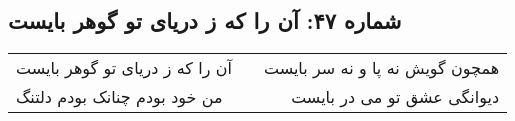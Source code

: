 \begin{center}
\section*{شماره ۴۷: آن را که ز دریای تو گوهر بایست}
\label{sec:047}
\begin{longtable}{l p{0.5cm} r}
آن را که ز دریای تو گوهر بایست
&&
همچون گویش نه پا و نه سر بایست
\\
من خود بودم چنانک بودم دلتنگ
&&
دیوانگی عشق تو می در بایست
\\
\end{longtable}
\end{center}
